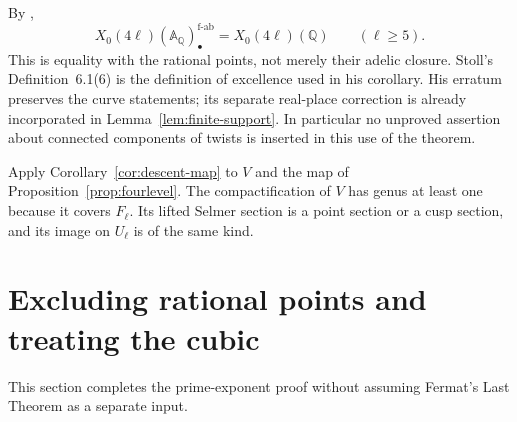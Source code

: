 \documentclass[11pt,a4paper]{article}
\newcommand{\Q}{\mathbb Q}
\newcommand{\A}{\mathbb A}
\newcommand{\fab}{\mathrm{f\text{-}ab}}
\theoremstyle{plain}
\theoremstyle{definition}
\begin{document}
By \citet[Corollary~8.8, pp.~385--386]{stoll},
\begin{equation}\label{eq:stollmodular}
 X_0(4\ell)(\A_\Q)_\bullet^{\fab}=X_0(4\ell)(\Q)
 \qquad(\ell\geq5).
\end{equation}
This is equality with the rational points, not merely their adelic
closure. Stoll's Definition~6.1(6) is the definition of excellence
used in his corollary. His erratum \citep[\S2(6)]{stollerrata}
preserves the curve statements; its separate real-place correction
is already incorporated in Lemma~\ref{lem:finite-support}.
In particular no unproved assertion about connected components of
twists is inserted in this use of the theorem.

Apply Corollary~\ref{cor:descent-map} to $V$ and the map of
Proposition~\ref{prop:fourlevel}. The compactification of $V$ has
genus at least one because it covers $F_\ell$. Its lifted Selmer
section is a point section or a cusp section, and its image on
$U_\ell$ is of the same kind.

\section{Excluding rational points and treating the cubic}\label{sec:points}

This section completes the prime-exponent proof without assuming Fermat's
Last Theorem as a separate input.
\end{document}
